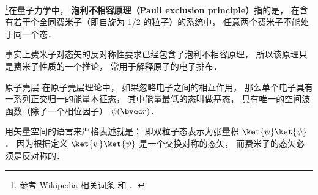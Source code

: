 
\footnote{参考 Wikipedia \href{https://en.wikipedia.org/wiki/Pauli_exclusion_principle}{相关词条} 和 \cite{GriffQ}．}在量子力学中， \textbf{泡利不相容原理（Pauli exclusion principle）}指的是， 在含有若干个全同费米子（即自旋为 1/2 的粒子）的系统中， 任意两个费米子不能处于同一个态．

事实上费米子对态矢的反对称性要求已经包含了泡利不相容原理， 所以该原理只是费米子性质的一个推论， 常用于解释原子的电子排布．

\begin{example}{原子壳层}
在原子壳层理论中， 如果忽略电子之间的相互作用， 那么单个电子具有一系列正交归一的能量本征态， 其中能量最低的态叫做基态， 具有唯一的空间波函数（除了一个相位因子） $\psi(\bvec r)$． 
\end{example}

用矢量空间的语言来严格表述就是： 即双粒子态表示为张量积 $\ket{\psi}\ket{\psi}$． 因为根据定义 $\ket{\psi}\ket{\psi}$ 是一个交换对称的态矢， 而费米子的态矢必须是反对称的．
